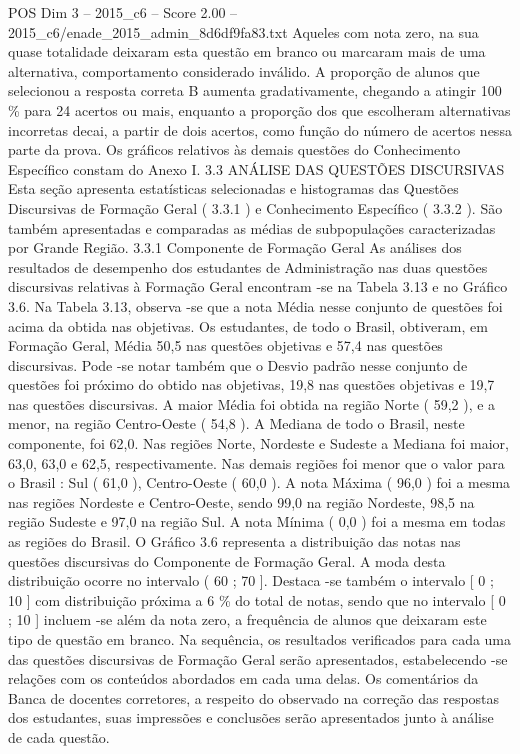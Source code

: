 \begin{textsample}{POS Dim 3 – 2015\_c6 – Score 2.00 – 2015\_c6/enade\_2015\_admin\_8d6df9fa83.txt}
Aqueles com nota zero, na sua quase totalidade deixaram esta questão em branco ou marcaram mais de uma alternativa, comportamento considerado inválido.
A proporção de alunos que selecionou a resposta correta B aumenta gradativamente, chegando a atingir 100 \% para 24 acertos ou mais, enquanto a proporção dos que escolheram alternativas incorretas decai, a partir de dois acertos, como função do número de acertos nessa parte da prova.
Os gráficos relativos às demais questões do Conhecimento Específico constam do Anexo I. 3.3 ANÁLISE DAS QUESTÕES DISCURSIVAS Esta seção apresenta estatísticas selecionadas e histogramas das Questões Discursivas de Formação Geral ( 3.3.1 ) e Conhecimento Específico ( 3.3.2 ).
São também apresentadas e comparadas as médias de subpopulações caracterizadas por Grande Região. 3.3.1 Componente de Formação Geral As análises dos resultados de desempenho dos estudantes de Administração nas duas questões discursivas relativas à Formação Geral encontram -se na Tabela 3.13 e no Gráfico 3.6.
Na Tabela 3.13, observa -se que a nota Média nesse conjunto de questões foi acima da obtida nas objetivas.
Os estudantes, de todo o Brasil, obtiveram, em Formação Geral, Média 50,5 nas questões objetivas e 57,4 nas questões discursivas.
Pode -se notar também que o Desvio padrão nesse conjunto de questões foi próximo do obtido nas objetivas, 19,8 nas questões objetivas e 19,7 nas questões discursivas.
A maior Média foi obtida na região Norte ( 59,2 ), e a menor, na região Centro-Oeste ( 54,8 ).
A Mediana de todo o Brasil, neste componente, foi 62,0.
Nas regiões Norte, Nordeste e Sudeste a Mediana foi maior, 63,0, 63,0 e 62,5, respectivamente.
Nas demais regiões foi menor que o valor para o Brasil : Sul ( 61,0 ), Centro-Oeste ( 60,0 ).
A nota Máxima ( 96,0 ) foi a mesma nas regiões Nordeste e Centro-Oeste, sendo 99,0 na região Nordeste, 98,5 na região Sudeste e 97,0 na região Sul.
A nota Mínima ( 0,0 ) foi a mesma em todas as regiões do Brasil.
O Gráfico 3.6 representa a distribuição das notas nas questões discursivas do Componente de Formação Geral.
A moda desta distribuição ocorre no intervalo ( 60 ; 70 ].
Destaca -se também o intervalo [ 0 ; 10 ] com distribuição próxima a 6 \% do total de notas, sendo que no intervalo [ 0 ; 10 ] incluem -se além da nota zero, a frequência de alunos que deixaram este tipo de questão em branco.
Na sequência, os resultados verificados para cada uma das questões discursivas de Formação Geral serão apresentados, estabelecendo -se relações com os conteúdos abordados em cada uma delas.
Os comentários da Banca de docentes corretores, a respeito do observado na correção das respostas dos estudantes, suas impressões e conclusões serão apresentados junto à análise de cada questão.

\end{textsample}
